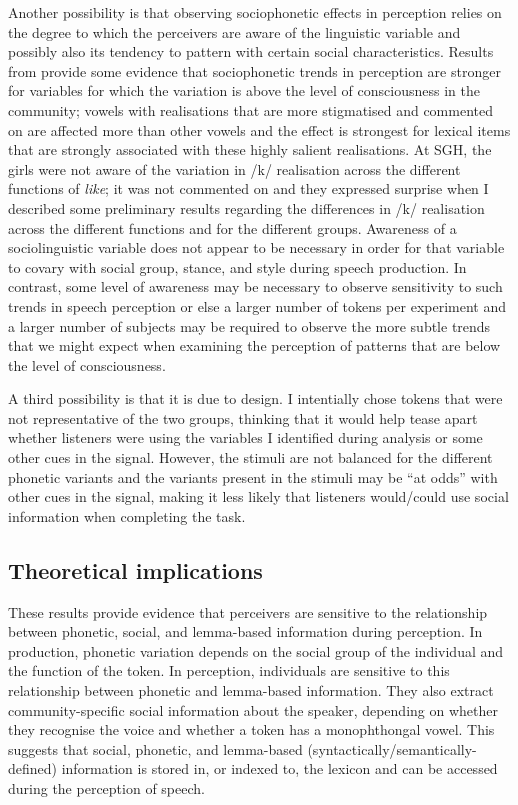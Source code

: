 Another possibility is that observing sociophonetic effects in perception relies on the degree to which the perceivers are aware of the linguistic variable and possibly also its tendency to pattern with certain social characteristics.  Results from  provide some evidence that sociophonetic trends in perception are stronger for variables for which the variation is above the level of consciousness in the community; vowels with realisations that are more stigmatised and commented on are affected more than other vowels and the effect is strongest for lexical items that are strongly associated with these highly salient realisations.  At SGH, the girls were not aware of the variation in /k/ realisation across the different functions of \textit{like}; it was not commented on and they expressed surprise when I described some preliminary results regarding the differences in /k/ realisation across the different functions and for the different groups.  Awareness of a sociolinguistic variable does not appear to be necessary in order for that variable to covary with social group, stance, and style during speech production.  In contrast, some level of awareness may be necessary to observe sensitivity to such trends in speech perception or else a larger number of tokens per experiment and a larger number of subjects may be required to observe the more subtle trends that we might expect when examining the perception of patterns that are below the level of consciousness.

A third possibility is that it is due to design.  I intentially chose tokens that were not representative of the two groups, thinking that it would help tease apart whether listeners were using the variables I identified during analysis or some other cues in the signal.  However, the stimuli are not balanced for the different phonetic variants and the variants present in the stimuli may be ``at odds'' with other cues in the signal, making it less likely that listeners would/could use social information when completing the task.


\subsection{Theoretical implications}

These results provide evidence that perceivers are sensitive to the relationship between phonetic, social, and lemma-based information during perception.  In production, phonetic variation depends on the social group of the individual and the function of the token.  In perception, individuals are sensitive to this relationship between phonetic and lemma-based information.  They also extract community-specific social information about the speaker, depending on whether they recognise the voice and whether a token has a monophthongal vowel.  This suggests that social, phonetic, and lemma-based (syntactically/semantically-defined) information is stored in, or indexed to, the lexicon and can be accessed during the perception of speech.

